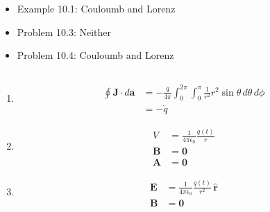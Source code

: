 \documentclass{article}
\renewcommand{\vec}[1]{\boldsymbol{\mathbf{#1}}}
\newcommand{\uvec}[1]{\hat{\vec{#1}}}
\newcommand{\ke}{\frac{1}{4 \pi \epsilon_0}}
\begin{document}
\begin{itemize}
  \item Example 10.1: Couloumb and Lorenz

  \item Problem 10.3: Neither

  \item Problem 10.4: Couloumb and Lorenz
\end{itemize}

\setcounter{subsection}{6}
\subsection{}

\begin{enumerate}
  \item

        \begin{align*}
          \oint \vec{J} \cdot d \vec{a} & = -\frac{\dot{q}}{4 \pi} \int_0^{2 \pi} \int_0^\pi \frac{1}{r^2} r^2 \sin \theta \,d \theta \,d \phi \\
                                        & = -\dot{q}
        \end{align*}

  \item

        \begin{align*}
          V       & = \ke \frac{q(t)}{r} \\
          \vec{B} & = \vec{0}            \\
          \vec{A} & = \vec{0}
        \end{align*}

  \item

        \begin{align*}
          \vec{E} & = \ke \frac{q(t)}{r^2} \,\uvec{r} \\
          \vec{B} & = \vec{0}
        \end{align*}
\end{enumerate}
\end{document}
